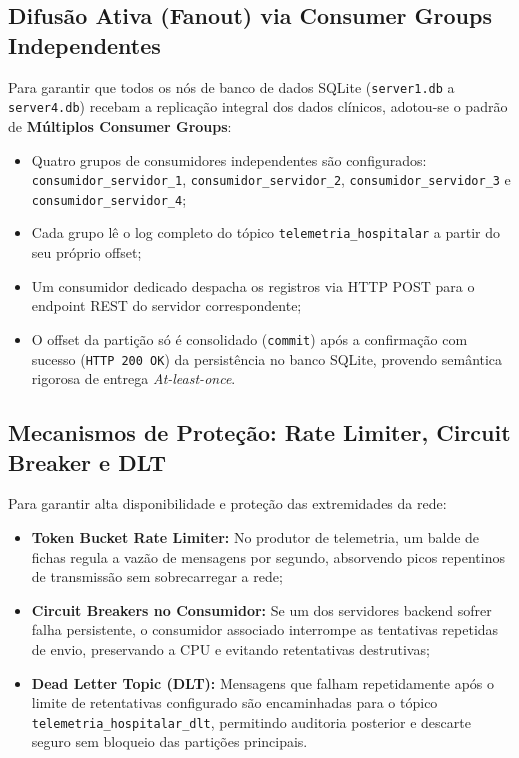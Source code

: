 \documentclass[12pt,a4paper]{article}
\begin{document}
\subsection{Difusão Ativa (Fanout) via Consumer Groups Independentes}
Para garantir que todos os nós de banco de dados SQLite (\texttt{server1.db} a \texttt{server4.db}) recebam a replicação integral dos dados clínicos, adotou-se o padrão de \textbf{Múltiplos Consumer Groups}:
\begin{itemize}
	\item Quatro grupos de consumidores independentes são configurados: \texttt{consumidor\_servidor\_1}, \texttt{consumidor\_servidor\_2}, \texttt{consumidor\_servidor\_3} e \texttt{consumidor\_servidor\_4};
	\item Cada grupo lê o log completo do tópico \texttt{telemetria\_hospitalar} a partir do seu próprio offset;
	\item Um consumidor dedicado despacha os registros via HTTP POST para o endpoint REST do servidor correspondente;
	\item O offset da partição só é consolidado (\texttt{commit}) após a confirmação com sucesso (\texttt{HTTP 200 OK}) da persistência no banco SQLite, provendo semântica rigorosa de entrega \textit{At-least-once}.
\end{itemize}

\subsection{Mecanismos de Proteção: Rate Limiter, Circuit Breaker e DLT}
Para garantir alta disponibilidade e proteção das extremidades da rede:
\begin{itemize}
	\item \textbf{Token Bucket Rate Limiter:} No produtor de telemetria, um balde de fichas regula a vazão de mensagens por segundo, absorvendo picos repentinos de transmissão sem sobrecarregar a rede;
	\item \textbf{Circuit Breakers no Consumidor:} Se um dos servidores backend sofrer falha persistente, o consumidor associado interrompe as tentativas repetidas de envio, preservando a CPU e evitando retentativas destrutivas;
	\item \textbf{Dead Letter Topic (DLT):} Mensagens que falham repetidamente após o limite de retentativas configurado são encaminhadas para o tópico \texttt{telemetria\_hospitalar\_dlt}, permitindo auditoria posterior e descarte seguro sem bloqueio das partições principais.
\end{itemize}
\end{document}
